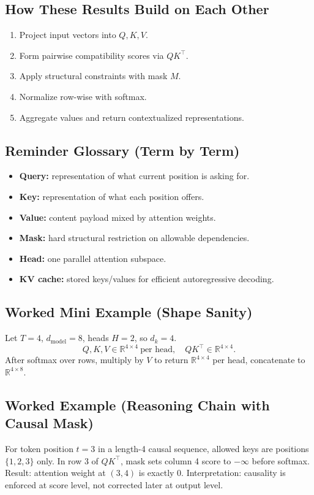 \subsection*{How These Results Build on Each Other}
\begin{enumerate}[leftmargin=1.5em]
  \item Project input vectors into $Q,K,V$.
  \item Form pairwise compatibility scores via $QK^\top$.
  \item Apply structural constraints with mask $M$.
  \item Normalize row-wise with softmax.
  \item Aggregate values and return contextualized representations.
\end{enumerate}

\subsection*{Reminder Glossary (Term by Term)}
\begin{itemize}[leftmargin=1.5em]
  \item \textbf{Query:} representation of what current position is asking for.
  \item \textbf{Key:} representation of what each position offers.
  \item \textbf{Value:} content payload mixed by attention weights.
  \item \textbf{Mask:} hard structural restriction on allowable dependencies.
  \item \textbf{Head:} one parallel attention subspace.
  \item \textbf{KV cache:} stored keys/values for efficient autoregressive decoding.
\end{itemize}

\subsection*{Worked Mini Example (Shape Sanity)}
Let $T=4$, $d_{\text{model}}=8$, heads $H=2$, so $d_k=4$.
\[
Q,K,V \in \mathbb{R}^{4\times 4}\ \text{per head},\quad QK^\top \in \mathbb{R}^{4\times 4}.
\]
After softmax over rows, multiply by $V$ to return $\mathbb{R}^{4\times 4}$ per head, concatenate to $\mathbb{R}^{4\times 8}$.

\subsection*{Worked Example (Reasoning Chain with Causal Mask)}
For token position $t=3$ in a length-4 causal sequence, allowed keys are positions $\{1,2,3\}$ only.  
In row 3 of $QK^\top$, mask sets column 4 score to $-\infty$ before softmax.  
Result: attention weight at $(3,4)$ is exactly 0.  
Interpretation: causality is enforced at score level, not corrected later at output level.

